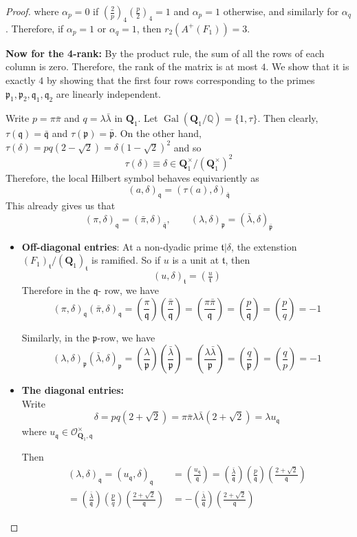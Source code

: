 \documentclass{article}
\numberwithin{equation}{section}
\theoremstyle{plain}  %
\theoremstyle{definition}
\newcommand{\Q}{\mathbb{Q}}
\newcommand{\ot}{\mathcal{O}}
\newcommand{\kron}[2]{\left( \tfrac{#1}{#2} \right)}
\DeclareMathOperator{\Gal}{Gal}
\newcommand{\fk}{\mathfrak }
\begin{document}
\begin{proof}
where $\alpha_p=0$ if $\kron{2}{p}_4 \kron{p}{2}_4=1$ and $\alpha_p=1$ otherwise, and similarly for $\alpha_q$. Therefore, if $\alpha_p=1$ or $\alpha_q=1$, then $r_2(A^+(F_1))=3$.

\textbf{Now for the 4-rank:}
By the product rule, the sum of all the rows of each column is zero. Therefore, the rank of the matrix is at most $4$. We show that it is exactly $4$ by showing that the first four rows corresponding to the primes $\fk p_1, \fk p_2, \fk q_1, \fk q_2$ are linearly independent.

Write $p = \pi \bar{\pi} $ and $q = \lambda \bar{\lambda}$ in $\mathbf Q_1$. Let $\Gal(\mathbf Q_1/\Q)=\{1,\tau \}$. Then clearly, $\tau(\fk q) = \bar{\fk q}$ and $\tau(\fk p) = \bar{\fk p}$. On the other hand, $\tau(\delta) = pq (2-\sqrt{2}) = \delta (1-\sqrt{2})^2$ and so 
$$\tau(\delta) \equiv \delta \in \mathbf{Q}_1^\times/(\mathbf{Q}_1^\times)^2$$ Therefore, the local Hilbert symbol behaves equivariently as 
$$(a,\delta)_{\fk q} = (\tau (a),\delta)_{\bar{\fk q}}$$ 
This already gives us that $$(\pi,\delta)_{\fk q} = (\bar{\pi},\delta)_{\bar{\fk q}}, \qquad (\lambda,\delta)_{\fk p} = (\bar{\lambda},\delta)_{\bar{\fk p}}$$

\begin{itemize}
    \item \textbf{Off-diagonal entries}: 
    At a non-dyadic prime $\fk t |\delta$, the extenstion $(F_1)_{\fk t}/(\mathbf Q_1)_{\fk t}$ is ramified. So if $u$ is a unit at $\fk t$, then $$(u,\delta)_{\fk t} = \kron{u}{\fk t}$$
Therefore in the $\fk q$- row, we have 
$$(\pi,\delta)_\fk q(\bar\pi,\delta)_\fk q
=\left(\frac{\pi}{\fk q}\right)\left(\frac{\bar\pi}{\fk q}\right)
=\left(\frac{\pi\bar\pi}{\fk q}\right)
=\left(\frac{p}{\fk q}\right)
=\left(\frac pq\right)=-1$$

Similarly, in the $\fk p$-row, we have
$$(\lambda,\delta)_\fk p(\bar\lambda,\delta)_\fk p
=\left(\frac{\lambda}{\fk p}\right)\left(\frac{\bar\lambda}{\fk p}\right)
=\left(\frac{\lambda\bar\lambda}{\fk p}\right)
=\left(\frac{q}{\fk p}\right)
=\left(\frac qp\right)=-1$$

\item \textbf{The diagonal entries:}
\\ Write $$\delta = pq(2+\sqrt{2})= \pi \bar{\pi} \lambda \bar \lambda(2+\sqrt{2}) = \lambda u_{\fk q}$$ where $u_{\fk q} \in \ot_{\mathbf Q_1,\fk q}^\times$  

Then 
\begin{align}
(\lambda,\delta)_{\fk q} = (u_\fk q, \delta)_{\fk q} & = \kron {u_\fk q}{\fk q}= \kron{\bar \lambda}{\fk q} \kron{p}{\fk q} \kron{2+\sqrt 2}{\fk q} \\ = \kron{\bar \lambda}{ \fk q} \kron{p}{q} \kron{2+\sqrt{2}}{\fk q} & = - \kron{\bar \lambda}{\fk q} \kron{2+\sqrt{2}}{\fk q}
\end{align}


\end{itemize}
\end{proof}
\end{document}
